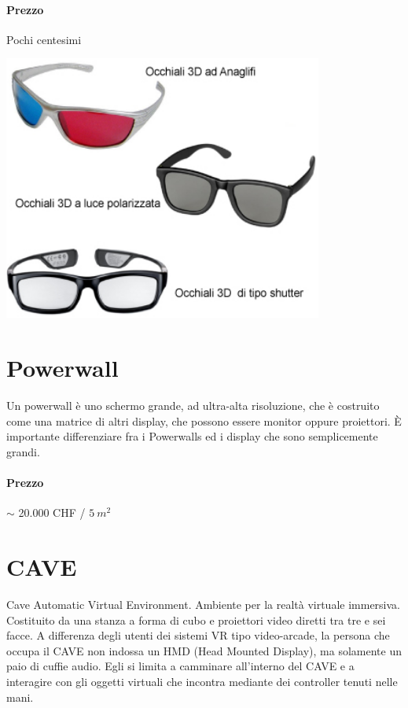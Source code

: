 \documentclass[8pt]{extarticle}
\begin{document}
\begin{multicols}{3}
\paragraph{Prezzo} Pochi centesimi
\begin{center}
    \begin{minipage}{0.5\columnwidth}
        \includegraphics[width=1\columnwidth]{glasses.png}
    \end{minipage}
\end{center}

\section{Powerwall}
Un powerwall è uno schermo grande, ad ultra-alta risoluzione, che è costruito come una matrice di altri display, che
possono essere monitor oppure proiettori. È importante differenziare fra i Powerwalls ed i display che sono
semplicemente grandi.

\paragraph{Prezzo} $\sim$ 20.000 CHF / $5\ m^2$
\section{CAVE}
Cave Automatic Virtual Environment. Ambiente per la realtà virtuale immersiva.
Costituito da una stanza a forma di cubo e proiettori video diretti
tra tre e sei facce.
A differenza degli utenti dei sistemi VR tipo video-arcade, la persona che occupa il CAVE non indossa un HMD 
(Head Mounted Display), ma solamente un paio di cuffie audio. 
Egli si limita a camminare all’interno del CAVE e a interagire con gli oggetti virtuali che incontra mediante dei 
controller tenuti nelle mani. 



\end{multicols}
\end{document}
